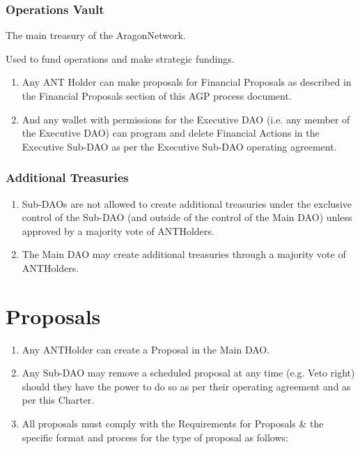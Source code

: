 \subsubsection*{Operations Vault} The main treasury of the \gls{AragonNetwork}.

Used to fund operations and make strategic fundings.
\begin{enumerate}
	\item Any \ac{ANT} Holder can make proposals for Financial Proposals as
	described in the Financial Proposals section of this \ac{AGP} process
	document.
	\item And any wallet with permissions for the Executive \ac{DAO} (i.e. any member of the Executive \ac{DAO}) can program and delete Financial Actions in the Executive Sub-\ac{DAO} as per the Executive Sub-\ac{DAO} operating agreement.
\end{enumerate}

\subsubsection*{Additional Treasuries}
\begin{enumerate}
	\item Sub-\acp{DAO} are not allowed to create additional treasuries under the exclusive control of the Sub-\ac{DAO} (and outside of the control of the Main \ac{DAO}) unless approved by a majority vote of \glspl{ANTHolder}.
	\item The Main \ac{DAO} may create additional treasuries through a majority vote of \glspl{ANTHolder}.
\end{enumerate}  


\section{Proposals}

\begin{enumerate}
	\item Any \ac{ANTHolder} can create a Proposal in the Main \ac{DAO}.
	\item Any Sub-\ac{DAO} may remove a scheduled proposal at any time (e.g. Veto right) should they have the power to do so as per their operating agreement and as per this Charter.
	\item All proposals must comply with the Requirements for Proposals \& the specific format and process for the type of proposal as follows:
\end{enumerate}

